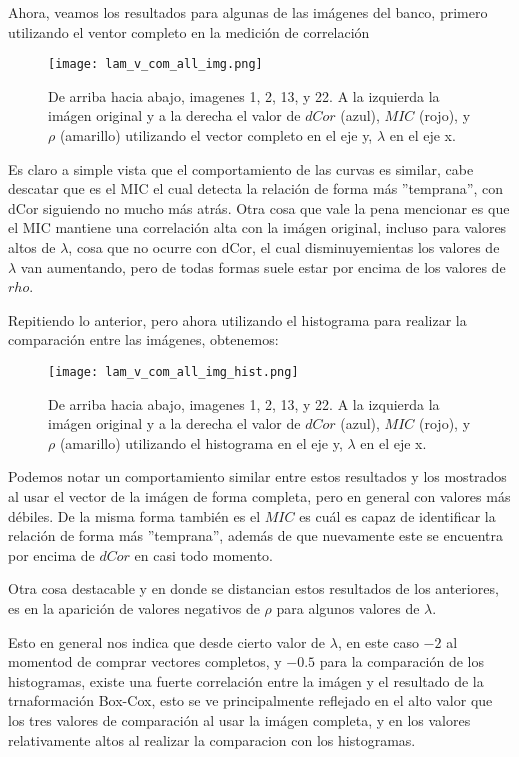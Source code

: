     Ahora, veamos los resultados para algunas de las im\'agenes del banco, primero utilizando el ventor completo en la medici\'on de correlaci\'on  

    \begin{figure}[H]
        \centering
        \texttt{[image: lam\_v\_com\_all\_img.png]}
        \caption{De arriba hacia abajo, imagenes 1, 2, 13, y 22. A la izquierda la im\'agen original y a la derecha el valor de $dCor$ (azul), $MIC$ (rojo), y $\rho$ (amarillo) utilizando el vector completo en el eje y, $\lambda$ en el eje x.}
    \end{figure}


    Es claro a simple vista que el comportamiento de las curvas es similar, cabe descatar que es el MIC el cual detecta la relaci\'on de forma m\'as ''temprana'', con dCor siguiendo no mucho m\'as atr\'as. Otra cosa que vale la pena mencionar es que el MIC mantiene una correlaci\'on alta con la im\'agen original, incluso para valores altos de $\lambda$, cosa que no ocurre con dCor, el cual disminuyemientas los valores de $\lambda$ van aumentando, pero de todas formas suele estar por encima de los valores de $rho$.

    Repitiendo lo anterior, pero ahora utilizando el histograma para realizar la comparaci\'on entre las im\'agenes, obtenemos:

    \begin{figure}[H]
        \centering
        \texttt{[image: lam\_v\_com\_all\_img\_hist.png]}
        \caption{De arriba hacia abajo, imagenes 1, 2, 13, y 22. A la izquierda la im\'agen original y a la derecha el valor de $dCor$ (azul), $MIC$ (rojo), y $\rho$ (amarillo) utilizando el histograma en el eje y, $\lambda$ en el eje x.}
    \end{figure}

        Podemos notar un comportamiento similar entre estos resultados y los mostrados al usar el vector de la im\'agen de forma completa, pero en general con valores m\'as d\'ebiles. De la misma forma tambi\'en es el $MIC$ es cu\'al es capaz de identificar la relaci\'on de forma m\'as ''temprana'', adem\'as de que nuevamente este se encuentra por encima de $dCor$ en casi todo momento.

        Otra cosa destacable y en donde se distancian estos resultados de los anteriores, es en la aparici\'on de valores negativos de $\rho$ para algunos valores de $\lambda$. 

        Esto en general nos indica que desde cierto valor de $\lambda$, en este caso $-2$ al momentod de comprar vectores completos, y $-0.5$ para la comparaci\'on de los histogramas, existe una fuerte correlaci\'on entre la im\'agen y el resultado de la trnaformaci\'on Box-Cox, esto se ve principalmente reflejado en el alto valor que los tres valores de comparaci\'on al usar la im\'agen completa, y en los valores relativamente altos al realizar la comparacion con los histogramas. 

